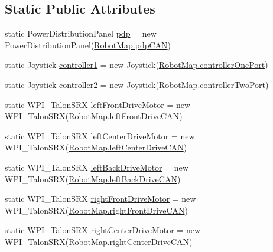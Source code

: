 \subsection*{Static Public Attributes}
\begin{DoxyCompactItemize}
\item 
static Power\+Distribution\+Panel \hyperlink{classfrc_1_1robot_1_1_o_i_a98d90326dfdaf14238d2f81c20c55f3f}{pdp} = new Power\+Distribution\+Panel(\hyperlink{classfrc_1_1robot_1_1_robot_map_af7db1426412719318df15f9838b70198}{Robot\+Map.\+pdp\+C\+AN})
\item 
static Joystick \hyperlink{classfrc_1_1robot_1_1_o_i_a06db411c1eebb80d10f685c57954bac9}{controller1} = new Joystick(\hyperlink{classfrc_1_1robot_1_1_robot_map_adf0118e5a9de03d6f71ea1e5a6a81cc9}{Robot\+Map.\+controller\+One\+Port})
\item 
static Joystick \hyperlink{classfrc_1_1robot_1_1_o_i_a749a3f830f90057dc4fd65e7f34a3251}{controller2} = new Joystick(\hyperlink{classfrc_1_1robot_1_1_robot_map_a762ebcaa07378c37d88654506850e07f}{Robot\+Map.\+controller\+Two\+Port})
\item 
static W\+P\+I\+\_\+\+Talon\+S\+RX \hyperlink{classfrc_1_1robot_1_1_o_i_a3f39e281419ebd60b94126e87e3ec81d}{left\+Front\+Drive\+Motor} = new W\+P\+I\+\_\+\+Talon\+S\+RX(\hyperlink{classfrc_1_1robot_1_1_robot_map_a2e3dbfb148d6fa2b7f430614887217f0}{Robot\+Map.\+left\+Front\+Drive\+C\+AN})
\item 
static W\+P\+I\+\_\+\+Talon\+S\+RX \hyperlink{classfrc_1_1robot_1_1_o_i_a8c33a9f0b9e366e48abd23ab01907e18}{left\+Center\+Drive\+Motor} = new W\+P\+I\+\_\+\+Talon\+S\+RX(\hyperlink{classfrc_1_1robot_1_1_robot_map_a9d04abf669a5ad42cb023e3ff3b56bcd}{Robot\+Map.\+left\+Center\+Drive\+C\+AN})
\item 
static W\+P\+I\+\_\+\+Talon\+S\+RX \hyperlink{classfrc_1_1robot_1_1_o_i_a88080d092baf8ece2c22f2ceec4f6f8f}{left\+Back\+Drive\+Motor} = new W\+P\+I\+\_\+\+Talon\+S\+RX(\hyperlink{classfrc_1_1robot_1_1_robot_map_a0f78f6850b0e060cc6acd88cc80ffa04}{Robot\+Map.\+left\+Back\+Drive\+C\+AN})
\item 
static W\+P\+I\+\_\+\+Talon\+S\+RX \hyperlink{classfrc_1_1robot_1_1_o_i_ae055ab4ea5a306737c950b1bfddf7352}{right\+Front\+Drive\+Motor} = new W\+P\+I\+\_\+\+Talon\+S\+RX(\hyperlink{classfrc_1_1robot_1_1_robot_map_a4ca461a7ad91df180971974fd6abc236}{Robot\+Map.\+right\+Front\+Drive\+C\+AN})
\item 
static W\+P\+I\+\_\+\+Talon\+S\+RX \hyperlink{classfrc_1_1robot_1_1_o_i_a9be3279c18d1f3433d6b07c706eb1457}{right\+Center\+Drive\+Motor} = new W\+P\+I\+\_\+\+Talon\+S\+RX(\hyperlink{classfrc_1_1robot_1_1_robot_map_a3ca36356410531e52126d2979ee17f13}{Robot\+Map.\+right\+Center\+Drive\+C\+AN})

\end{DoxyCompactItemize}
